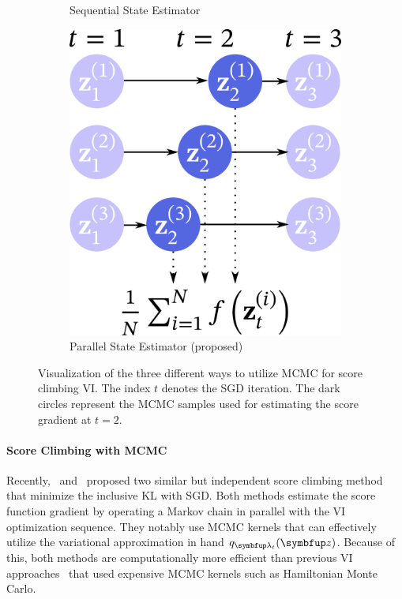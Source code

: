 \begin{figure}
\begin{subfigure}[b]{0.35\textwidth}
        \caption{Sequential State Estimator}\label{fig:seq}
    \end{subfigure}
    \begin{subfigure}[b]{0.3\textwidth}
        \centering
        \includegraphics[scale=0.25]{figures/diagram_3.png}
        \caption{Parallel State Estimator (proposed)}\label{fig:par}
    \end{subfigure}
    \caption{Visualization of the three different ways to utilize MCMC for score climbing VI.
      The index \(t\) denotes the SGD iteration.
      The dark circles represent the MCMC samples used for estimating the score gradient at \(t=2\).
    }\label{fig:overview}
  \vspace{-0.1in}
\end{figure}
%
\vspace{-0.05in}
\paragraph{Score Climbing with MCMC}
Recently,~\citet{NEURIPS2020_b2070693} and~\citet{pmlr-v124-ou20a} proposed two similar but independent score climbing method that minimize the inclusive KL with SGD.
Both methods estimate the score function gradient by operating a Markov chain in parallel with the VI optimization sequence.
They notably use MCMC kernels that can effectively utilize the variational approximation in hand \(q_{\vlambda_t}(\vz)\).
Because of this, both methods are computationally more efficient than previous VI approaches~\citep{pmlr-v97-ruiz19a, pmlr-v70-hoffman17a} that used expensive MCMC kernels such as Hamiltonian Monte Carlo.

